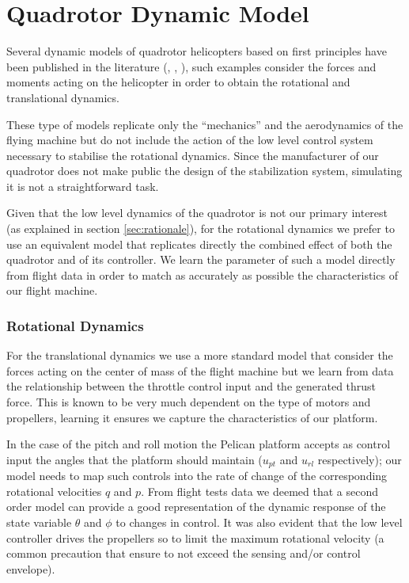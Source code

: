 \documentclass[a4paper,11pt]{report}
\begin{document}
\section{Quadrotor Dynamic Model}

Several dynamic models of quadrotor helicopters based on first principles have been published in the literature (\cite{bouabdallah07phd}, \cite{balas07modelling}, \cite{hoffmann07quadrotor}), such examples consider the forces and moments acting on the helicopter in order to obtain the rotational and translational dynamics.

These type of models replicate only the ``mechanics'' and the aerodynamics of the flying machine but do not include the action of the low level control system necessary to stabilise the rotational dynamics. Since the manufacturer of our quadrotor does not make public the design of the stabilization system, simulating it is not a straightforward task. 

Given that the low level dynamics of the quadrotor is not our primary interest (as explained in section \ref{sec:rationale}), for the rotational dynamics we prefer to use an equivalent  model that replicates directly the combined effect of both the quadrotor and of its controller.
We learn the parameter of such a model directly from flight data in order to match as accurately as possible the characteristics of our flight machine.

\subsubsection{Rotational Dynamics}
For the translational dynamics we use a more standard model that consider the forces acting on the center of mass of the flight machine but we learn from data the relationship between the throttle control input and the generated thrust force. This is known to be very much dependent on the type of motors and propellers, learning it ensures we capture the characteristics of our platform.

In the case of the pitch and roll motion the Pelican platform accepts as control input the angles that the platform should maintain ($u_{pt}$ and $u_{rl}$ respectively); our model needs to map such controls into the rate of change of the corresponding rotational velocities $q$ and $p$. 
From flight tests data we deemed that a second order model can provide a good representation of the dynamic response of the state variable $\theta$ and $\phi$ to changes in control. It was also evident that the low level controller drives the propellers so to limit the maximum rotational velocity (a common precaution that ensure to not exceed the sensing and/or control envelope). 
\end{document}
